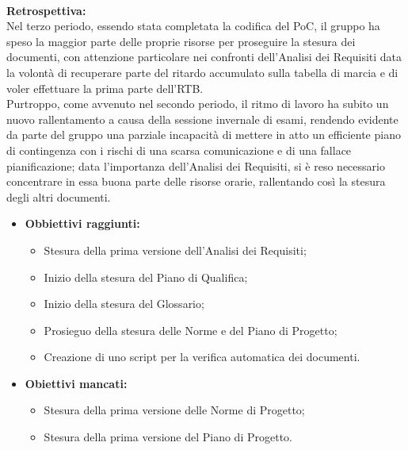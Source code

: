 \paragraph{}
\textbf{Retrospettiva:} \\
Nel terzo periodo, essendo stata completata la codifica del PoC, il gruppo ha speso la maggior parte delle proprie risorse per proseguire la stesura dei documenti, con attenzione
particolare nei confronti dell'Analisi dei Requisiti data la volontà di recuperare parte del ritardo accumulato sulla tabella di marcia e di voler effettuare la prima parte dell'RTB.\\
Purtroppo, come avvenuto nel secondo periodo, il ritmo di lavoro ha subito un nuovo rallentamento a causa della sessione invernale di esami, rendendo evidente da parte del gruppo una
parziale incapacità di mettere in atto un efficiente piano di contingenza con i rischi di una scarsa comunicazione e di una fallace pianificazione; data l'importanza dell'Analisi
dei Requisiti, si è reso necessario concentrare in essa buona parte delle risorse orarie, rallentando così la stesura degli altri documenti.
\begin{itemize}
    \item \textbf{Obbiettivi raggiunti:}
    \begin{itemize}
        \item Stesura della prima versione dell'Analisi dei Requisiti;
        \item Inizio della stesura del Piano di Qualifica;
        \item Inizio della stesura del Glossario;
        \item Prosieguo della stesura delle Norme e del Piano di Progetto;
        \item Creazione di uno script per la verifica automatica dei documenti.
    \end{itemize}
    \item \textbf{Obiettivi mancati:}
    \begin{itemize}
        \item Stesura della prima versione delle Norme di Progetto;
        \item Stesura della prima versione del Piano di Progetto.
    \end{itemize}
\end{itemize}

